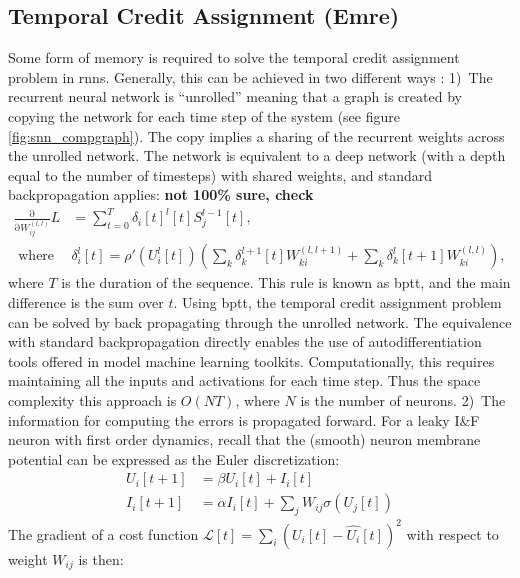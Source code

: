 \documentclass[journal,onecolumn,11pt]{IEEEtran}
\begin{document}
\subsection{Temporal Credit Assignment (Emre)}
\label{sec:temporal_credit_assignment}
Some form of memory is required to solve the temporal credit assignment problem in \glspl{rnn}. 
Generally, this can be achieved in two different ways \cite{Williams_Zipser89_learalgo}:
1)~The recurrent neural network is ``unrolled'' meaning that a graph is created by copying the network for each time step of the system (see figure \ref{fig:snn_compgraph}). The copy implies a sharing of the recurrent weights across the unrolled network. The network is equivalent to a deep network (with a depth equal to the number of timesteps) with shared weights, and standard backpropagation applies:
%
{\bf not 100\% sure, check}
\begin{equation}\label{eq:bp_deep}
  \begin{split}
    \frac{\mathrm{\partial}}{\mathrm{\partial} W^{(l,l)}_{ij}} L & = \sum_{t=0}^T \delta_{i}[t]^{l}[t]  S^{l-1}_j[t],\\
      \text{ where } &
      \delta_{i}^{l} [t] = \rho'\left( U_i^l [t] \right) \left( \sum_k \delta_{k}^{l+1}[t] W_{ki}^{(l,l+1)} + \sum_k \delta_{k}^{l}[t+1] W_{ki}^{(l,l)} \right),
  \end{split}
\end{equation}
%
where $T$ is the duration of the sequence.
This rule is known as \gls{bptt}, and the main difference is the sum over $t$.
Using \gls{bptt}, the temporal credit assignment problem can be solved by back propagating through the unrolled network.
The equivalence with standard backpropagation directly enables the use of autodifferentiation tools offered in model machine learning toolkits.
Computationally, this requires maintaining all the inputs and activations for each time step. Thus the space complexity this approach is $O(N T)$, where $N$ is the number of neurons.
2)~The information for computing the errors is propagated forward.
For a leaky I\&F neuron with first order dynamics, recall that the (smooth) neuron membrane potential can be expressed as the Euler discretization:
\[
\begin{split}
U_i[t+1] & = \beta U_i[t] + I_i[t]\\
  I_i[t+1] & = \alpha I_i[t] + \sum_j W_{ij} \sigma(U_j[t])
\end{split}
\]
The gradient of a cost function $\mathcal{L}[t] = \sum_i (U_i[t]-\hat{U_i}[t])^2$ with respect to weight $W_{ij}$ is then:
\end{document}
